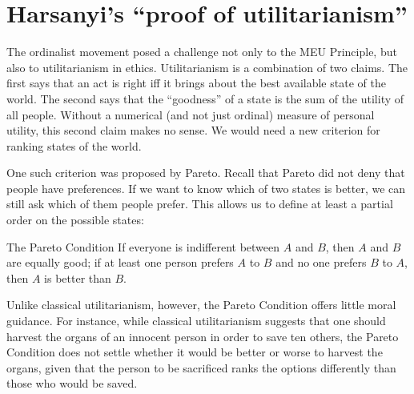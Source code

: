 
\section{Harsanyi's ``proof of utilitarianism''}\label{sec:utilitarianism}

The ordinalist movement posed a challenge not only to the MEU Principle, but
also to utilitarianism in ethics. Utilitarianism is a combination of two claims.
The first says that an act is right iff it brings about the best available state
of the world. The second says that the ``goodness'' of a state is the sum of the
utility of all people. Without a numerical (and not just ordinal) measure of
personal utility, this second claim makes no sense. We would need a new
criterion for ranking states of the world.

One such criterion was proposed by Pareto. Recall that Pareto did not deny that
people have preferences. If we want to know which of two states is better, we
can still ask which of them people prefer. This allows us to define at least a
partial order on the possible states:
%
\begin{genericthm}{The Pareto Condition}
  If everyone is indifferent between $A$ and $B$, then $A$ and $B$ are equally
  good; if at least one person prefers $A$ to $B$ and no one prefers $B$ to $A$,
  then $A$ is better than $B$.
\end{genericthm}
%
Unlike classical utilitarianism, however, the Pareto Condition offers little
moral guidance. For instance, while classical utilitarianism suggests that one
should harvest the organs of an innocent person in order to save ten others, the
Pareto Condition does not settle whether it would be better or worse to harvest
the organs, given that the person to be sacrificed ranks the options differently
than those who would be saved.


